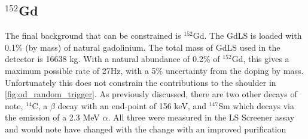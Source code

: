 






\subsection{${}^{152}$Gd}
\par
The final background that can be constrained is ${}^{152}$Gd.
The GdLS is loaded with 0.1\% (by mass) of natural gadolinium.
The total mass of GdLS used in the detector is 16638 kg.
With a natural abundance of 0.2\% of ${}^{152}$Gd, this gives a maximum possible rate of 27Hz, with a 5\% uncertainty from the doping by mass.
Unfortunately this does not constrain the contributions to the shoulder in \autoref{fig:od_random_trigger}.
As previously discussed, there are two other decays of note, ${}^{14}$C, a $\beta$ decay with an end-point of 156 keV, and ${}^{147}$Sm which decays via the emission of a 2.3 MeV $\alpha$.
All three were measured in the LS Screener assay and would note have changed with the change with an improved purification \cite{scotthaselschwardt_thesis_ref}


